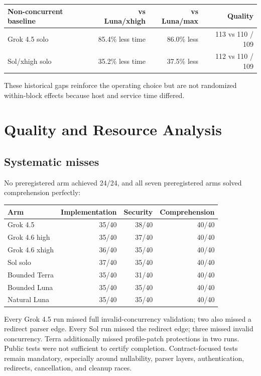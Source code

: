 \documentclass[11pt,oneside]{article}
\begin{document}
\begin{center}
\small
\begin{tabular}{@{}lrrr@{}}
\toprule
Non-concurrent baseline & vs Luna/xhigh & vs Luna/max & Quality \\
\midrule
Grok 4.5 solo & 85.4\% less time & 86.0\% less & 113 vs 110 / 109 \\
Sol/xhigh solo & 35.2\% less time & 37.5\% less & 112 vs 110 / 109 \\
\bottomrule
\end{tabular}
\end{center}

These historical gaps reinforce the operating choice but are not randomized
within-block effects because host and service time differed.

\section{Quality and Resource Analysis}

\subsection{Systematic misses}

No preregistered arm achieved 24/24, and all seven preregistered arms solved
comprehension perfectly:

\begin{center}
\begin{tabular}{@{}lrrr@{}}
\toprule
Arm & Implementation & Security & Comprehension \\
\midrule
Grok 4.5 & 35/40 & 38/40 & 40/40 \\
Grok 4.6 high & 35/40 & 37/40 & 40/40 \\
Grok 4.6 xhigh & 36/40 & 35/40 & 40/40 \\
Sol solo & 37/40 & 35/40 & 40/40 \\
Bounded Terra & 35/40 & 31/40 & 40/40 \\
Bounded Luna & 35/40 & 35/40 & 40/40 \\
Natural Luna & 35/40 & 35/40 & 40/40 \\
\bottomrule
\end{tabular}
\end{center}

Every Grok 4.5 run missed full invalid-concurrency validation; two also missed a
redirect parser edge. Every Sol run missed the redirect edge; three missed
invalid concurrency. Terra additionally missed profile-patch protections in two
runs. Public tests were not sufficient to certify completion. Contract-focused
tests remain mandatory, especially around nullability, parser layers,
authentication, redirects, cancellation, and cleanup races.
\end{document}
